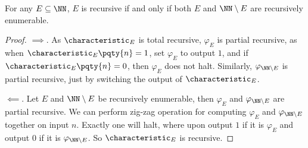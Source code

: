 \begin{theorem}
    For any \(E \subseteq \NN\), \(E\) is recursive if and only if both \(E\) and \(\NN \setminus E\) are recursively enumerable.
\end{theorem}

\begin{proof}
    \(\implies\). As \(\characteristic_E\) is total recursive, \(\varphi_E\) is partial recursive, as when \(\characteristic_E\pqty{n} = 1\), set \(\varphi_E\) to output \(1\), and if \(\characteristic_E\pqty{n} = 0\), then \(\varphi_E\) does not halt. Similarly, \(\varphi_{\NN \setminus E}\) is partial recursive, just by switching the output of \(\characteristic_E\).

    \(\impliedby\). Let \(E\) and \(\NN \setminus E\) be recursively enumerable, then \(\varphi_E\) and \(\varphi_{\NN \setminus E}\) are partial recursive. We can perform zig-zag operation for computing \(\varphi_E\) and \(\varphi_{\NN \setminus E}\) together on input \(n\). Exactly one will halt, where upon output \(1\) if it is \(\varphi_E\) and output \(0\) if it is \(\varphi_{\NN \setminus E}\). So \(\characteristic_E\) is recursive.
\end{proof}